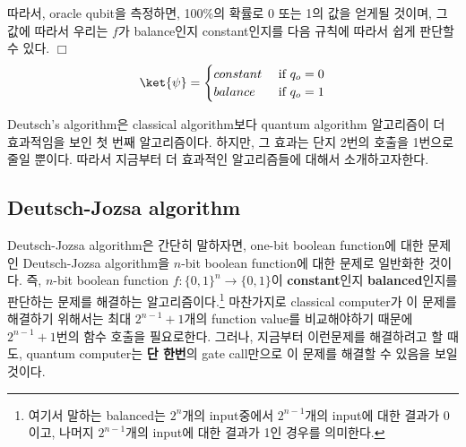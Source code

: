 따라서, oracle qubit을 측정하면, 100\%의 확률로 0 또는 1의 값을 얻게될 것이며, 그 값에 따라서 우리는 $f$가 balance인지 constant인지를 다음 규칙에 따라서 쉽게 판단할 수 있다. $\Box$
\begin{equation*}
  \ket{\psi} = \begin{cases}
    constant & \text{ if } q_o = 0\\ 
    balance & \text{ if } q_o = 1
  \end{cases}
\end{equation*}

Deutsch’s algorithm은 classical algorithm보다 quantum algorithm 알고리즘이 더 효과적임을 보인 첫 번째 알고리즘이다. 하지만, 그 효과는 단지 2번의 호출을 1번으로 줄일 뿐이다.
따라서 지금부터 더 효과적인 알고리즘들에 대해서 소개하고자한다.

\subsection{Deutsch-Jozsa algorithm}
Deutsch-Jozsa algorithm은 간단히 말하자면, one-bit boolean function에 대한 문제인 Deutsch-Jozsa algorithm을 $n$-bit boolean function에 대한 문제로 일반화한 것이다.
즉, $n$-bit boolean function $f: \{0, 1\}^n \rightarrow \{0, 1\}$이 \textbf{constant}인지 \textbf{balanced}인지를 판단하는 문제를 해결하는 알고리즘이다.\footnote{여기서 말하는 balanced는 $2^n$개의 input중에서 $2^{n-1}$개의 input에 대한 결과가 0이고, 나머지 $2^{n-1}$개의 input에 대한 결과가 1인 경우를 의미한다.}
마찬가지로 classical computer가 이 문제를 해결하기 위해서는 최대 $2^{n-1}+1$개의 function value를 비교해야하기 때문에 $2^{n-1}+1$번의 함수 호출을 필요로한다. 그러나, 지금부터 이런문제를 해결하려고 할 때도, quantum computer는 \textbf{단 한번}의 gate call만으로 이 문제를 해결할 수 있음을 보일 것이다.

